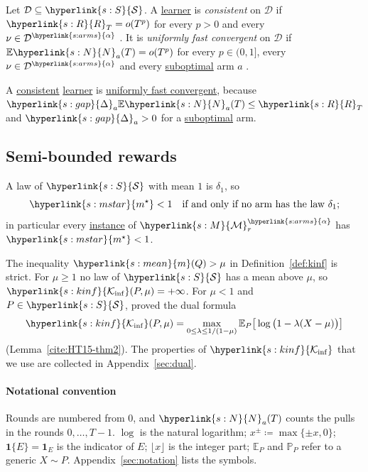 \documentclass[11pt]{article}
\newcommand{\E}{\mathbb{E}}
\newcommand{\Prob}{\mathbb{P}}
\newcommand{\ind}{\mathbf{1}}
\newcommand{\dt}[1]{\hypertarget{#1}{}}
\newcommand{\sy}[2]{{\hyperlink{#1}{#2}}}
\newcommand{\term}[2]{\hyperlink{#1}{#2}}
\newcommand{\Sm}{\sy{s:S}{\mathcal{S}}}
\newcommand{\Mm}{\sy{s:M}{\mathcal{M}}}
\newcommand{\mean}{\sy{s:mean}{m}}
\newcommand{\arms}{\sy{s:arms}{\alpha}}
\newcommand{\ms}{\sy{s:mstar}{m^{\star}}}
\newcommand{\gap}{\sy{s:gap}{\Delta}}
\newcommand{\Kinf}{\sy{s:kinf}{\mathcal{K}_{\inf}}}
\newcommand{\Np}{\sy{s:N}{N}}
\newcommand{\Reg}{\sy{s:R}{R}}
\begin{document}
\begin{definition}[Consistency]\label{def:classes}
Let $\mathcal D\subseteq\Sm$. \dt{w:consistent}A \term{w:learner}{learner} is \emph{consistent} on $\mathcal D$ if $\Reg_T=o(T^p)$ for
every $p>0$ and every $\nu\in\mathcal D^\arms$ \citep[Definition~16.1]{LS}. \dt{w:ufc}It is \emph{uniformly fast
convergent} on $\mathcal D$ if $\E \Np_a(T)=o(T^p)$ for every $p\in(0,1]$, every $\nu\in\mathcal D^\arms$
and every \term{w:subopt}{suboptimal} arm $a$ \citep[Definition~1]{GMS19}.
\end{definition}

A \term{w:consistent}{consistent} \term{w:learner}{learner} is \term{w:ufc}{uniformly fast convergent}, because $\gap_a\E \Np_a(T)\le \Reg_T$ and
$\gap_a>0$ for a \term{w:subopt}{suboptimal} arm.

\subsection{Semi-bounded rewards}

A law of $\Sm$ with mean $1$ is $\delta_1$, so
\begin{equation*}
  \ms<1\quad\text{if and only if no arm has the law }\delta_1;
\end{equation*}
in particular every \term{w:instance}{instance} of $\Mm_r^\arms$ has $\ms<1$.

The inequality $\mean(Q)>\mu$ in Definition~\ref{def:kinf} is strict. For $\mu\ge1$ no law of $\Sm$ has a
mean above $\mu$, so $\Kinf(P,\mu)=+\infty$. For $\mu<1$ and $P\in\Sm$, \citet{HT15} proved the dual
formula
\begin{equation}\label{eq:dual}
  \Kinf(P,\mu)=\max_{0\le\lambda\le1/(1-\mu)}\E_P\big[\log\big(1-\lambda(X-\mu)\big)\big]
\end{equation}
(Lemma~\ref{cite:HT15-thm2}). The properties of $\Kinf$ that we use are collected in
Appendix~\ref{sec:dual}.

\paragraph{Notational convention} Rounds are numbered from $0$, and $\Np_a(T)$ counts the pulls in
the rounds $0,\dots,T-1$. $\log$ is the natural logarithm; $x^\pm\coloneqq\max\{\pm x,0\}$;
$\ind\{E\}=\ind_E$ is the indicator of $E$; $\lfloor x\rfloor$ is the integer part; $\E_P$ and
$\Prob_P$ refer to a generic $X\sim P$. Appendix~\ref{sec:notation} lists the symbols.
\end{document}

